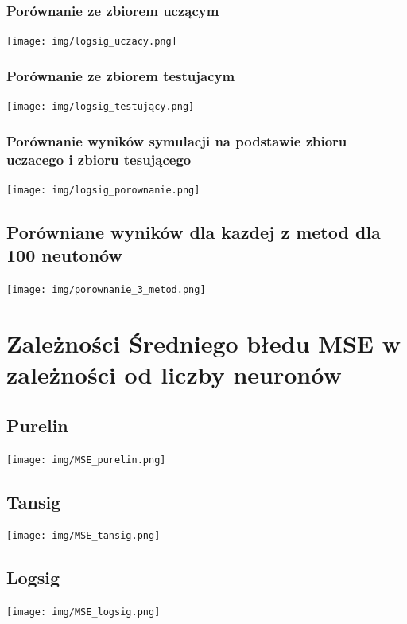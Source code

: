 \documentclass[12pt,titlepage]{article}
\begin{document}
\begin{landscape}
        \subsubsection{Porównanie ze zbiorem uczącym}
        \texttt{[image: img/logsig\_uczacy.png]}\\
        \subsubsection{Porównanie ze zbiorem testujacym}

        \texttt{[image: img/logsig\_testujący.png]}\\

        \subsubsection{Porównanie wyników symulacji na podstawie zbioru uczacego i zbioru tesującego}
        \texttt{[image: img/logsig\_porownanie.png]}\\

        \subsection{Porówniane wyników dla kazdej z metod dla 100 neutonów}
        \texttt{[image: img/porownanie\_3\_metod.png]}\\


        \section{Zależności Średniego błedu MSE w zależności od liczby neuronów}

        \subsection{Purelin}
        \texttt{[image: img/MSE\_purelin.png]}\\

        \subsection{Tansig}
        \texttt{[image: img/MSE\_tansig.png]}\\

        \subsection{Logsig}
        \texttt{[image: img/MSE\_logsig.png]}\\
    \end{landscape}
\end{document}
